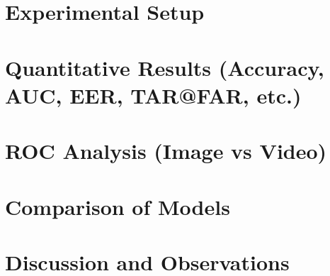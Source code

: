 \section{Experimental Setup}
\section{Quantitative Results (Accuracy, AUC, EER, TAR@FAR, etc.)}
\section{ROC Analysis (Image vs Video)}
\section{Comparison of Models}
\section{Discussion and Observations}
